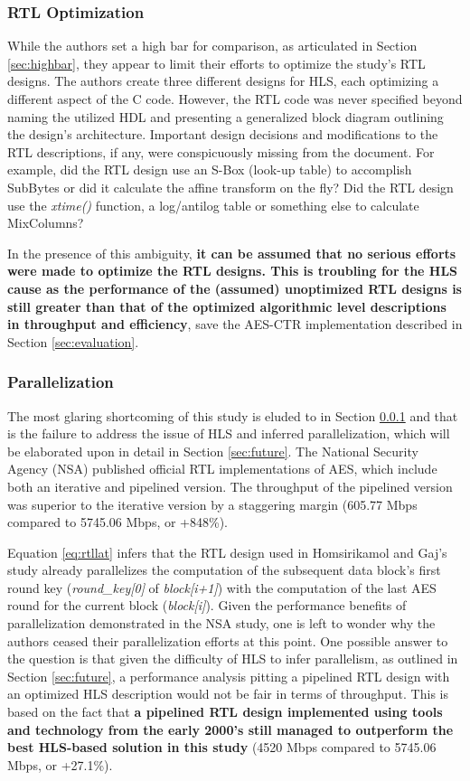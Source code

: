 \documentclass[12pt,journal,compsoc,onecolumn]{IEEEtran}
\begin{document}
\subsubsection{RTL Optimization}\label{sec:rtlop}
While the authors set a high bar for comparison, as articulated in Section \ref{sec:highbar}, they appear to limit their efforts to optimize the study's RTL designs. The authors create three different designs for HLS, each optimizing a different aspect of the C code. However, the RTL code was never specified beyond naming the utilized HDL and presenting a generalized block diagram outlining the design's architecture. Important design decisions and modifications to the RTL descriptions, if any, were conspicuously missing from the document. For example, did the RTL design use an S-Box (look-up table) to accomplish SubBytes or did it calculate the affine transform on the fly? Did the RTL design use the \emph{xtime()} function, a log/antilog table or something else to calculate MixColumns? 

In the presence of this ambiguity, \textbf{it can be assumed that no serious efforts were made to optimize the RTL designs. This is troubling for the HLS cause as the performance of the (assumed) unoptimized RTL designs is still greater than that of the optimized algorithmic level descriptions in throughput and efficiency}, save the AES-CTR implementation described in Section \ref{sec:evaluation}.

\subsubsection{Parallelization}\label{sec:parallel}
The most glaring shortcoming of this study is eluded to in Section \ref{sec:rtlop} and that is the failure to address the issue of HLS and inferred parallelization, which will be elaborated upon in detail in Section \ref{sec:future}. The National Security Agency (NSA) published official RTL implementations of AES, which include both an iterative and pipelined version\cite{nsa}. The throughput of the pipelined version was superior to the iterative version by a staggering margin (605.77 Mbps compared to 5745.06 Mbps, or +848\%)\cite{nsaweeks}.

Equation \ref{eq:rtllat} infers that the RTL design used in Homsirikamol and Gaj's study already parallelizes the computation of the subsequent data block's first round key (\emph{round\_key[0]} of \emph{block[i+1]}) with the computation of the last AES round for the current block (\emph{block[i]}). Given the performance benefits of parallelization demonstrated in the NSA study, one is left to wonder why the authors ceased their parallelization efforts at this point. One possible answer to the question is that given the difficulty of HLS to infer parallelism, as outlined in Section \ref{sec:future}, a performance analysis pitting a pipelined RTL design with an optimized HLS description would not be fair in terms of throughput. This is based on the fact that \textbf{a pipelined RTL design implemented using tools and technology from the early 2000's still managed to outperform the best HLS-based solution in this study} (4520 Mbps compared to 5745.06 Mbps\cite{nsaweeks}, or +27.1\%). 
\end{document}

